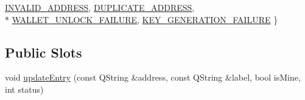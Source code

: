 \begin{DoxyCompactItemize}
\hyperlink{class_address_table_model_a3d502b85fc09461e779dae4589c29956a7e1e745ad0209b0cd8dd5866a7615021}{I\+N\+V\+A\+L\+I\+D\+\_\+\+A\+D\+D\+R\+E\+S\+S}, 
\hyperlink{class_address_table_model_a3d502b85fc09461e779dae4589c29956af9cc220dea0573d7819eebfa84c1691f}{D\+U\+P\+L\+I\+C\+A\+T\+E\+\_\+\+A\+D\+D\+R\+E\+S\+S}, 
\\*
\hyperlink{class_address_table_model_a3d502b85fc09461e779dae4589c29956a164544f37fe7cfbf17283015eca6fdb3}{W\+A\+L\+L\+E\+T\+\_\+\+U\+N\+L\+O\+C\+K\+\_\+\+F\+A\+I\+L\+U\+R\+E}, 
\hyperlink{class_address_table_model_a3d502b85fc09461e779dae4589c29956a9e181f9108c727771403c11c6a9a62dd}{K\+E\+Y\+\_\+\+G\+E\+N\+E\+R\+A\+T\+I\+O\+N\+\_\+\+F\+A\+I\+L\+U\+R\+E}
 \}
\end{DoxyCompactItemize}
\subsection*{Public Slots}
\begin{DoxyCompactItemize}
\item 
void \hyperlink{class_address_table_model_a78d9d6f3db0ced72a29a32f487ab1c7f}{update\+Entry} (const Q\+String \&address, const Q\+String \&label, bool is\+Mine, int status)
\end{DoxyCompactItemize}
